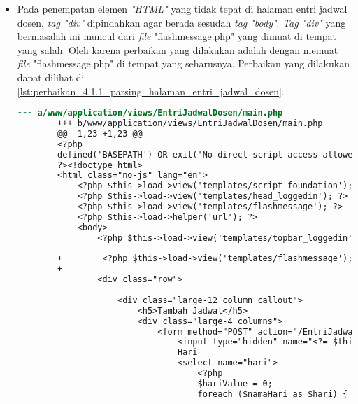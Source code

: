 \begin{itemize}
    \item Pada penempatan elemen \textit{"HTML"} yang tidak tepat di halaman entri jadwal dosen, \textit{tag "div"} dipindahkan agar berada sesudah \textit{tag "body"}. \textit{Tag "div"} yang bermasalah ini muncul dari \textit{file} "flashmessage.php" yang dimuat di tempat yang salah. Oleh karena perbaikan yang dilakukan adalah dengan memuat \textit{file} "flashmessage.php" di tempat yang seharusnya. Perbaikan yang dilakukan dapat dilihat di \ref{lst:perbaikan_4.1.1_parsing_halaman_entri_jadwal_dosen}.
    \begin{lstlisting}[frame=single, label={lst:perbaikan_4.1.1_parsing_halaman_entri_jadwal_dosen}, language=diff, caption=Perbaikan Kriteria Sukses 4.1.1 - Kesalahan Elemen pada Halaman Entri Jadwal Dosen]
        --- a/www/application/views/EntriJadwalDosen/main.php
        +++ b/www/application/views/EntriJadwalDosen/main.php
        @@ -1,23 +1,23 @@
        <?php
        defined('BASEPATH') OR exit('No direct script access allowed');
        ?><!doctype html>
        <html class="no-js" lang="en">
            <?php $this->load->view('templates/script_foundation'); ?>
            <?php $this->load->view('templates/head_loggedin'); ?>
        -	<?php $this->load->view('templates/flashmessage'); ?>
            <?php $this->load->helper('url'); ?>
            <body>
                <?php $this->load->view('templates/topbar_loggedin'); ?>
        -
        +        <?php $this->load->view('templates/flashmessage'); ?>
        +        
                <div class="row">
        
                    <div class="large-12 column callout">
                        <h5>Tambah Jadwal</h5>
                        <div class="large-4 columns">
                            <form method="POST" action="/EntriJadwalDosen/add">
                                <input type="hidden" name="<?= $this->security->get_csrf_token_name() ?>" value="<?= $this->security->get_csrf_hash() ?>" />
                                Hari
                                <select name="hari">  
                                    <?php
                                    $hariValue = 0;
                                    foreach ($namaHari as $hari) {
    \end{lstlisting} 
\end{itemize}